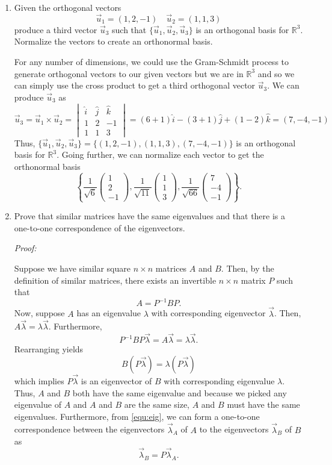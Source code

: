 \documentclass[a4paper,12pt]{article}
\newcommand{\reals}{\mathbb{R}}
\newcommand{\pmat}[1]{\begin{pmatrix} #1 \end{pmatrix}}
\newenvironment{proof}[2][$\square$]
    {\setlength{\parskip}{0pt}\par\textit{Proof:} #2\setlength{\parskip}{0.25cm}
        \savebox{\qed}{#1}
        \begin{adjustwidth}{\widthof{Proof:}}{}
    }
    {
        \hfill\usebox{\qed}\end{adjustwidth}
    }
\begin{document}
\begin{enumerate}[label = \arabic*.]
	\item Given the orthogonal vectors
	\[
		\vec{u}_1 = (1,2,-1) \quad \vec{u}_2 = (1, 1, 3)
	\]
	produce a third vector $ \vec{u}_3 $ such that $ \{\vec{u}_1, \vec{u}_2, \vec{u}_3\} $ is an orthogonal basis for $ \reals^3 $. Normalize the vectors to create an orthonormal basis.
	
	For any number of dimensions, we could use the Gram-Schmidt process to generate orthogonal vectors to our given vectors but we are in $ \reals^3 $ and so we can simply use the cross product to get a third orthogonal vector $ \vec{u}_3 $. We can produce $ \vec{u}_3 $ as
	\[
		\vec{u}_3 = \vec{u}_1 \times \vec{u}_2
		=
		\begin{vmatrix}
			\hat{i} & \hat{j} & \hat{k} \\
			1 & 2 & -1 \\
			1 & 1 & 3
		\end{vmatrix}
		=
		(6 + 1)\hat{i} - (3 + 1)\hat{j} + (1 - 2)\hat{k} = (7, -4, -1)
	\]
	Thus, $ \{\vec{u}_1, \vec{u}_2, \vec{u}_3\} = \{(1,2,-1), (1,1,3), (7,-4,-1)\} $ is an orthogonal basis for $ \reals^3 $. Going further, we can normalize each vector to get the orthonormal basis
	\[
		\left\{
		\frac{1}{\sqrt{6}} \pmat{1 \\ 2 \\ -1},
		\frac{1}{\sqrt{11}} \pmat{1 \\ 1 \\ 3},
		\frac{1}{\sqrt{66}} \pmat{7 \\ -4 \\ -1} 
		\right\}.
	\]
	
	\item Prove that similar matrices have the same eigenvalues and that there is a one-to-one correspondence of the eigenvectors.
	
	\begin{proof}{}
		Suppose we have similar square $ n \times n $ matrices $ A $ and $ B $. Then, by the definition of similar matrices, there exists an invertible $ n \times n $ matrix $ P $ such that
		\begin{equation}
			A = P^{-1} B P. \label{equ:sim}
		\end{equation}
		Now, suppose $ A $ has an eigenvalue $ \lambda $ with corresponding eigenvector $ \vec{\lambda} $. Then, $ A \vec{\lambda} = \lambda \vec{\lambda} $. Furthermore,
		\[
			P^{-1} B P \vec{\lambda} = A \vec{\lambda} = \lambda \vec{\lambda}.
		\]
		Rearranging yields
		\begin{equation}
			B (P \vec{\lambda}) = \lambda (P \vec{\lambda}) \label{equ:eig}
		\end{equation}
		which implies $ P \vec{\lambda} $ is an eigenvector of $ B $ with corresponding eigenvalue $ \lambda $. Thus, $ A $ and $ B $ both have the same eigenvalue and because we picked any eigenvalue of $ A $ and $ A $ and $ B $ are the same size, $ A $ and $ B $ must have the same eigenvalues. Furthermore, from \eqref{equ:eig}, we can form a one-to-one correspondence between the eigenvectors $ \vec{\lambda}_A $ of $ A $ to the eigenvectors $ \vec{\lambda}_B $ of $ B $ as
		\[
			\vec{\lambda}_B = P \vec{\lambda}_A.
		\]
	\end{proof}


\end{enumerate}
\end{document}
